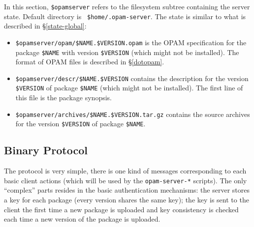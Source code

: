 \documentclass[a4paper,11pt]{article}
\begin{document}
In this section, {\tt \$opamserver} refers to the filesystem subtree
containing the server state. Default directory is {\tt
  \$home/.opam-server}. The state is similar to what is described in
\S\ref{state-global}:

\begin{itemize}
\item \verb+$opamserver/opam/$NAME.$VERSION.opam+ is the OPAM
  specification for the package \verb+$NAME+ with version
  \verb+$VERSION+ (which might not be installed). The format of OPAM
  files is described in \S\ref{dotopam}.

\item \verb+$opamserver/descr/$NAME.$VERSION+ contains the description
  for the version \verb+$VERSION+ of package \verb+$NAME+ (which might
  not be installed). The first line of this file is the package
  synopsis.

\item \verb+$opamserver/archives/$NAME.$VERSION.tar.gz+ contains the
  source archives for the version \verb+$VERSION+ of package
  \verb+$NAME+.

\end{itemize}

\subsection{Binary Protocol}
\label{binary-protocol}

The protocol is very simple, there is one kind of messages
corresponding to each basic client actions (which will be used by the
{\tt opam-server-*} scripts). The only ``complex'' parts resides in
the basic authentication mechanisms: the server stores a key for each
package (every version shares the same key); the key is sent to the
client the first time a new package is uploaded and key consistency is
checked each time a new version of the package is uploaded.
\end{document}
